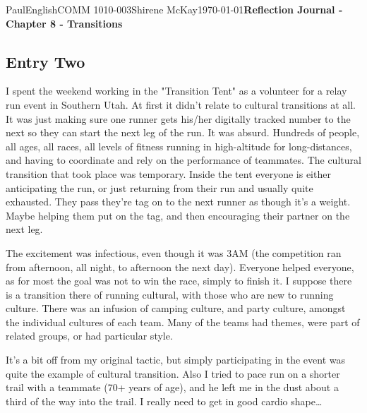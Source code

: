 \documentclass[12pt,letterpaper]{article}
\begin{document}
\begin{mla}{Paul}{English}{COMM 1010-003}{Shirene
    McKay}{\today}{\textbf{Reflection Journal - Chapter 8 - Transitions}}
\subsection{Entry Two}

I spent the weekend working in the "Transition Tent" as a volunteer for a relay run event in Southern Utah. At first it didn't relate to cultural transitions at all. It was just making sure one runner gets his/her digitally tracked number to the next so they can start the next leg of the run. It was absurd. Hundreds of people, all ages, all races, all levels of fitness running in high-altitude for long-distances, and having to coordinate and rely on the performance of teammates. The cultural transition that took place was temporary. Inside the tent everyone is either anticipating the run, or just returning from their run and usually quite exhausted. They pass they're tag on to the next runner as though it's a weight. Maybe helping them put on the tag, and then encouraging their partner on the next leg.

The excitement was infectious, even though it was 3AM (the competition ran from afternoon, all night, to afternoon the next day). Everyone helped everyone, as for most the goal was not to win the race, simply to finish it. I suppose there is a transition there of running cultural, with those who are new to running culture. There was an infusion of camping culture, and party culture, amongst the individual cultures of each team. Many of the teams had themes, were part of related groups, or had particular style.

It's a bit off from my original tactic, but simply participating in the event was quite the example of cultural transition. Also I tried to pace run on a shorter trail with a teammate (70+ years of age), and he left me in the dust about a third of the way into the trail. I really need to get in good cardio shape\dots

\end{mla}
\end{document}
